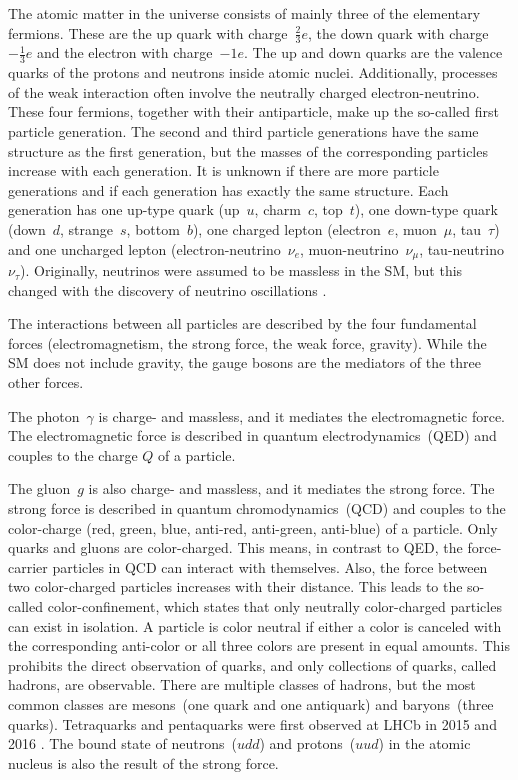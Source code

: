The atomic matter in the universe consists of mainly three of the elementary fermions. 
These are the up quark with charge~$\frac{2}{3}e$, the down quark with charge~$-\frac{1}{3}e$ and the electron with charge~$-1e$.
The up and down quarks are the valence quarks of the protons and neutrons inside atomic nuclei.
Additionally, processes of the weak interaction often involve the neutrally charged electron-neutrino.
These four fermions, together with their antiparticle, make up the so-called first particle generation.
The second and third particle generations have the same structure as the first generation, but the masses of the corresponding particles increase with each generation.
It is unknown if there are more particle generations and if each generation has exactly the same structure.
Each generation has one up-type quark (up~$u$, charm~$c$, top~$t$), one down-type quark (down~$d$, strange~$s$, bottom~$b$), one charged lepton (electron~$e$, muon~$\mu$, tau~$\tau$) and one uncharged lepton (electron-neutrino~$\nu_e$, muon-neutrino~$\nu_\mu$, tau-neutrino~$\nu_\tau$).
Originally, neutrinos were assumed to be massless in the SM, but this changed with the discovery of neutrino oscillations \cite{NeutrinoMassSK,NeutrinoMassSNO}. 

The interactions between all particles are described by the four fundamental forces (electromagnetism, the strong force, the weak force, gravity).
While the SM does not include gravity, the gauge bosons are the mediators of the three other forces.

The photon~$\gamma$ is charge- and massless, and it mediates the electromagnetic force.
The electromagnetic force is described in quantum electrodynamics~(QED) and couples to the charge $Q$ of a particle.

The gluon~$g$ is also charge- and massless, and it mediates the strong force.
The strong force is described in quantum chromodynamics~(QCD) and couples to the color-charge (red, green, blue, anti-red, anti-green, anti-blue) of a particle.
Only quarks and gluons are color-charged.
This means, in contrast to QED, the force-carrier particles in QCD can interact with themselves.
Also, the force between two color-charged particles increases with their distance.
This leads to the so-called color-confinement, which states that only neutrally color-charged particles can exist in isolation.
A particle is color neutral if either a color is canceled with the corresponding anti-color or all three colors are present in equal amounts.
This prohibits the direct observation of quarks, and only collections of quarks, called hadrons, are observable.
There are multiple classes of hadrons, but the most common classes are mesons~(one quark and one antiquark) and baryons~(three quarks).
Tetraquarks and pentaquarks were first observed at LHCb in 2015 and 2016 \cite{TetraquarkLHCb,PentaquarkLHCb}. 
The bound state of neutrons~($udd$) and protons~($uud$) in the atomic nucleus is also the result of the strong force.

